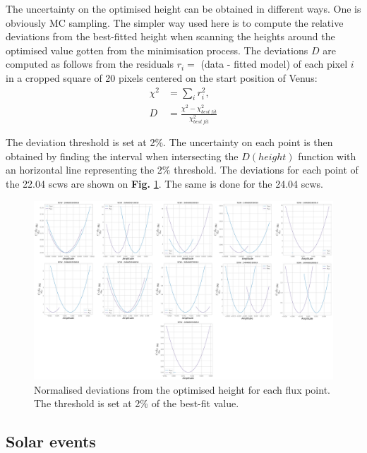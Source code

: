         The uncertainty on the optimised height can be obtained in different ways. One is obviously MC sampling. The simpler way used here is to compute the relative deviations from the best-fitted height when scanning the heights around the optimised value gotten from the minimisation process. The deviations $D$ are computed as follows from the residuals $r_i = $ (data - fitted model) of each pixel $i$ in a cropped square of 20 pixels centered on the start position of Venus:
        \begin{align}
            \chi^2 &= \sum_i r_i^2, \\
            D &= \frac{\chi^2-\chi_{best\, fit}^2}{\chi_{best\, fit}^2} 
        \end{align}
        
        The deviation threshold is set at 2\%. The uncertainty on each point is then obtained by finding the interval when intersecting the $D(height)$ function with an horizontal line representing the 2\% threshold. The deviations for each point of the 22.04 scws are shown on \textbf{Fig.} \ref{threshold}. The same is done for the 24.04 scws.

        \begin{figure}[H]
        \centering
        \includegraphics[width = \textwidth]{report/Figures/models/2204/threshold_determination_notconst.png}
        \caption{Normalised deviations from the optimised height for each flux point. The threshold is set at 2\% of the best-fit value.}
        \label{threshold}
        \end{figure}

    
    
    \subsection{Solar events}

